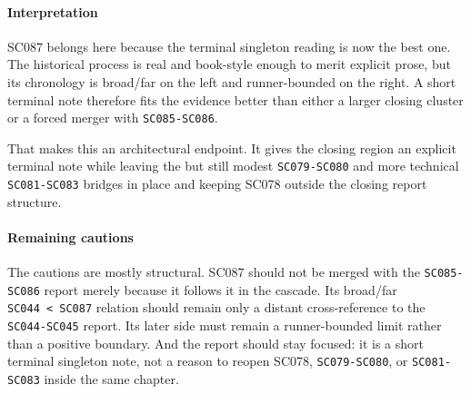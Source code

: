 \documentclass[
  british,
  a4paper,
]{article}
\begin{document}
\paragraph{Interpretation}\label{interpretation-52}

SC087 belongs here because the terminal singleton reading is now the
best one. The historical process is real and book-style enough to merit
explicit prose, but its chronology is broad/far on the left and
runner-bounded on the right. A short terminal note therefore fits the
evidence better than either a larger closing cluster or a forced merger
with \texttt{SC085-SC086}.

That makes this an architectural endpoint. It gives the closing region
an explicit terminal note while leaving the but still modest
\texttt{SC079-SC080} and more technical \texttt{SC081-SC083} bridges in
place and keeping SC078 outside the closing report structure.

\paragraph{Remaining cautions}\label{remaining-cautions-52}

The cautions are mostly structural. SC087 should not be merged with the
\texttt{SC085-SC086} report merely because it follows it in the cascade.
Its broad/far \texttt{SC044\ \textless{}\ SC087} relation should remain
only a distant cross-reference to the \texttt{SC044-SC045} report. Its
later side must remain a runner-bounded limit rather than a positive
boundary. And the report should stay focused: it is a short terminal
singleton note, not a reason to reopen SC078, \texttt{SC079-SC080}, or
\texttt{SC081-SC083} inside the same chapter.
\end{document}
